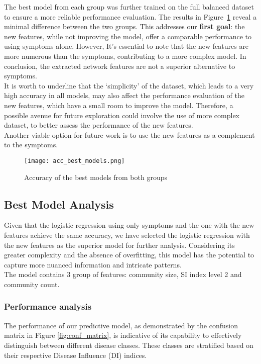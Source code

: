 \noindent
The best model from each group was further trained on the full balanced dataset to ensure a more reliable
performance evaluation. The results in Figure~\ref{fig:acc_best_models} reveal a minimal difference between
the two groups. This addresses our \textbf{first goal}: the new features, while not improving the model,
offer a comparable performance to using symptoms alone. However, It's essential to note that the new features are
more numerous than the symptoms, contributing to a more complex model. In conclusion, the extracted network
features are not a superior alternative to symptoms.\\
It is worth to underline that the `simplicity' of the dataset, which leads to a very high accuracy in all models, may also affect the performance
evaluation of the new features, which have a small room to improve the model. Therefore, a possible avenue
for future exploration could involve the use of more complex dataset, to better assess the performance of the
new features.\\
Another viable option for future work is to use the new features as a complement to the symptoms.




\begin{figure}[H]
	\centering
	\texttt{[image: acc\_best\_models.png]}
	\caption{Accuracy of the best models from both groups}\label{fig:acc_best_models}
\end{figure}




\subsection{Best Model Analysis}
Given that the logistic regression using only symptoms and the one with the new features achieve the same accuracy,
we have selected the logistic regression with the new features as the superior model for further analysis.
Considering its greater complexity and the absence of overfitting,
this model has the potential to capture more nuanced information and intricate patterns.\\
The model contains 3 group of features: community size, SI index level 2 and community count.
\subsubsection*{Performance analysis}
The performance of our predictive model, as demonstrated by the confusion matrix in Figure \ref{fig:conf_matrix},
is indicative of its capability to effectively distinguish between different disease classes.
These classes are stratified based on their respective Disease Influence (DI) indices.

